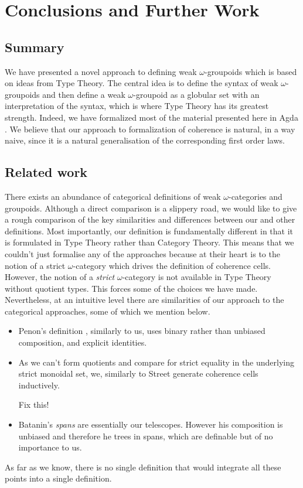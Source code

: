 \section{Conclusions and Further Work}
\label{sec:conclusions}

\subsection{Summary}
We have presented a novel approach to defining weak $\omega$-groupoids
which is based on ideas from Type Theory. The central idea is to
define the syntax of weak $\omega$-groupoids and then define a weak
$\omega$-groupoid as a globular set with an interpretation of the
syntax, which is where Type Theory has its greatest strength. Indeed,
we have formalized most of the material presented here in Agda
\cite{agda}.  We believe that our approach to formalization of
coherence is natural, in a way naive, since it is a natural
generalisation of the corresponding first order laws.

\subsection{Related work}
There exists an abundance of categorical definitions of weak
$\omega$-categories and groupoids.  Although a direct comparison is a
slippery road, we would like to give a rough comparison of the key
similarities and differences between our and other definitions. Most
importantly, our definition is fundamentally different in that it is
formulated in Type Theory rather than Category Theory. This means that
we couldn't just formalise any of the approaches
\cite{penon:1999,batanin98:monoidal-globular,leinster:2000} because at
their heart is to the notion of a strict $\omega$-category which
drives the definition of coherence cells. However, the notion of a
\emph{strict} $\omega$-category is not available in Type Theory
without quotient types. This forces some of the choices we have
made. Nevertheless, at an intuitive level there are similarities of our approach to the
categorical approaches, some of which we mention below.
\begin{itemize}
\item Penon's definition \cite{penon:1999}, similarly to us, uses
  binary rather than unbiased composition, and explicit
  identities. 
\item As we can't form quotients and compare for strict equality in
  the underlying strict monoidal set, we, similarly to Street
  \cite{street87:simplexes} generate coherence cells
  inductively. 
\begin{ondrej}Fix this!
\end{ondrej}
\item Batanin's \emph{spans} are essentially our telescopes. However
  his composition is unbiased and therefore he trees in spans, which
  are definable but of no importance to us. 
\end{itemize}
%
As far as we know, there is no single definition that would
integrate all these points into a single definition. 



